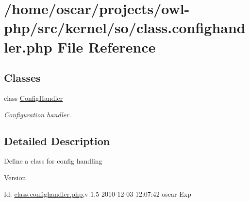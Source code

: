 \section{/home/oscar/projects/owl-\/php/src/kernel/so/class.confighandler.php File Reference}
\label{class_8confighandler_8php}
\subsection*{Classes}
\begin{DoxyCompactItemize}
\item 
class \hyperlink{classConfigHandler}{ConfigHandler}
\begin{DoxyCompactList}\small\item\em Configuration handler. \item\end{DoxyCompactList}\end{DoxyCompactItemize}


\subsection{Detailed Description}
Define a class for config handling \begin{DoxyVersion}{Version}

\end{DoxyVersion}
\begin{DoxyParagraph}{Id:}
\hyperlink{class_8confighandler_8php}{class.confighandler.php},v 1.5 2010-\/12-\/03 12:07:42 oscar Exp 
\end{DoxyParagraph}
